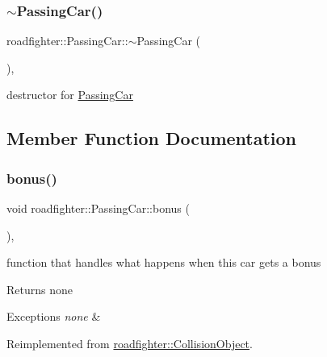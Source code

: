 \subsubsection{\texorpdfstring{$\sim$\+Passing\+Car()}{~PassingCar()}}
{\footnotesize\ttfamily roadfighter\+::\+Passing\+Car\+::$\sim$\+Passing\+Car (\begin{DoxyParamCaption}{ }\end{DoxyParamCaption})\hspace{0.3cm}{\ttfamily [override]}, {\ttfamily [default]}}

destructor for \hyperlink{classroadfighter_1_1PassingCar}{Passing\+Car} 

\subsection{Member Function Documentation}
\mbox{\label{classroadfighter_1_1PassingCar_a43d55e28efe840d81c1b87216920eb69}} 
\subsubsection{\texorpdfstring{bonus()}{bonus()}}
{\footnotesize\ttfamily void roadfighter\+::\+Passing\+Car\+::bonus (\begin{DoxyParamCaption}{ }\end{DoxyParamCaption})\hspace{0.3cm}{\ttfamily [override]}, {\ttfamily [virtual]}}

function that handles what happens when this car gets a bonus \begin{DoxyReturn}{Returns}
none 
\end{DoxyReturn}

\begin{DoxyExceptions}{Exceptions}
{\em none} & \\
\hline
\end{DoxyExceptions}


Reimplemented from \hyperlink{classroadfighter_1_1CollisionObject_ad35887bb3cfb8c054eaaee56306d6944}{roadfighter\+::\+Collision\+Object}.

\mbox{\label{classroadfighter_1_1PassingCar_a04ee71b75c90f21efef591756855bf37}} 
